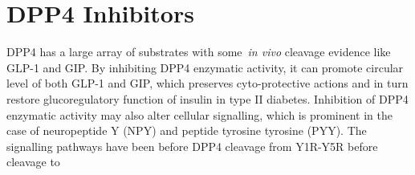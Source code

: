 \section{DPP4 Inhibitors}
DPP4 has a large array of substrates with some~\textit{in vivo} cleavage evidence like GLP-1 and GIP. By inhibiting DPP4 enzymatic activity, it can promote circular level of both GLP-1 and GIP, which preserves cyto-protective actions and in turn restore glucoregulatory function of insulin in type II diabetes. Inhibition of DPP4 enzymatic activity may also alter cellular signalling, which is prominent in the case of neuropeptide Y (NPY) and peptide tyrosine tyrosine (PYY). The signalling pathways have been before DPP4 cleavage from Y1R-Y5R before cleavage to 
